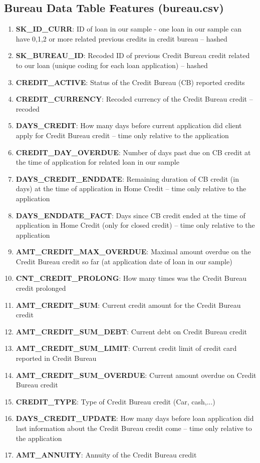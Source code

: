 \documentclass[12pt, letterpaper]{article}
\begin{document}
\begin{appendices}
\subsection{Bureau Data Table Features (bureau.csv)}
\begin{enumerate}
  \item \textbf{SK_ID_CURR}: ID of loan in our sample - one loan in our sample can have 0,1,2 or more related previous credits in credit bureau -- hashed
  \item \textbf{SK_BUREAU_ID}: Recoded ID of previous Credit Bureau credit related to our loan (unique coding for each loan application) -- hashed
  \item \textbf{CREDIT_ACTIVE}: Status of the Credit Bureau (CB) reported credits
  \item \textbf{CREDIT_CURRENCY}: Recoded currency of the Credit Bureau credit -- recoded
  \item \textbf{DAYS_CREDIT}: How many days before current application did client apply for Credit Bureau credit -- time only relative to the application
  \item \textbf{CREDIT_DAY_OVERDUE}: Number of days past due on CB credit at the time of application for related loan in our sample
  \item \textbf{DAYS_CREDIT_ENDDATE}: Remaining duration of CB credit (in days) at the time of application in Home Credit -- time only relative to the application
  \item \textbf{DAYS_ENDDATE_FACT}: Days since CB credit ended at the time of application in Home Credit (only for closed credit) -- time only relative to the application
  \item \textbf{AMT_CREDIT_MAX_OVERDUE}: Maximal amount overdue on the Credit Bureau credit so far (at application date of loan in our sample)
  \item \textbf{CNT_CREDIT_PROLONG}: How many times was the Credit Bureau credit prolonged
  \item \textbf{AMT_CREDIT_SUM}: Current credit amount for the Credit Bureau credit
  \item \textbf{AMT_CREDIT_SUM_DEBT}: Current debt on Credit Bureau credit
  \item \textbf{AMT_CREDIT_SUM_LIMIT}: Current credit limit of credit card reported in Credit Bureau
  \item \textbf{AMT_CREDIT_SUM_OVERDUE}: Current amount overdue on Credit Bureau credit
  \item \textbf{CREDIT_TYPE}: Type of Credit Bureau credit (Car, cash,...)
  \item \textbf{DAYS_CREDIT_UPDATE}: How many days before loan application did last information about the Credit Bureau credit come -- time only relative to the application
  \item \textbf{AMT_ANNUITY}: Annuity of the Credit Bureau credit
\end{enumerate}


\end{appendices}
\end{document}
